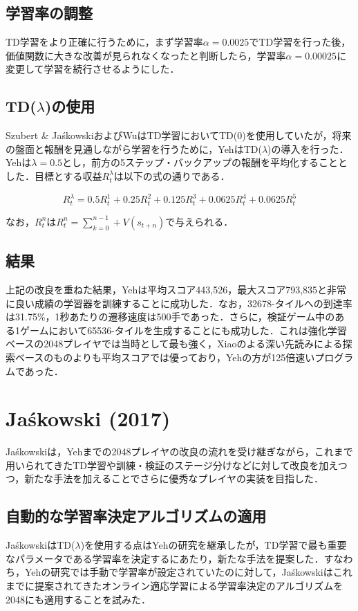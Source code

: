 \documentclass{suribt}
\begin{document}
\subsection{学習率の調整}
TD学習をより正確に行うために，まず学習率$\alpha = 0.0025$でTD学習を行った後，価値関数に大きな改善が見られなくなったと判断したら，学習率$\alpha = 0.00025$に変更して学習を続行させるようにした．

\subsection{TD(${\lambda}$)の使用}
Szubert \& Ja\'{s}kowskiおよびWuはTD学習においてTD(0)を使用していたが，将来の盤面と報酬を見通しながら学習を行うために，YehはTD(${\lambda}$)の導入を行った．Yehは${\lambda}=0.5$とし，前方の5ステップ・バックアップの報酬を平均化することとした．目標とする収益$R^{\lambda}_t$は以下の式の通りである．

\[
R^{\lambda}_t = 0.5R^1_t + 0.25R^2_t + 0.125R^3_t + 0.0625R^4_t + 0.0625R^5_t
\]

なお，$R^n_t$は$R^n_t = \sum_{k=0}^{n-1} + V(s_{t+n})$で与えられる．

\subsection{結果}
上記の改良を重ねた結果，Yehは平均スコア443,526，最大スコア793,835と非常に良い成績の学習器を訓練することに成功した．なお，32678-タイルへの到達率は31.75\%，1秒あたりの遷移速度は500手であった．さらに，検証ゲーム中のある1ゲームにおいて65536-タイルを生成することにも成功した．これは強化学習ベースの2048プレイヤでは当時として最も強く，Xiaoのよる深い先読みによる探索ベースのものよりも平均スコアでは優っており，Yehの方が125倍速いプログラムであった．

\section{Ja\'{s}kowski (2017)}
Ja\'{s}kowskiは，Yehまでの2048プレイヤの改良の流れを受け継ぎながら，これまで用いられてきたTD学習や訓練・検証のステージ分けなどに対して改良を加えつつ，新たな手法を加えることでさらに優秀なプレイヤの実装を目指した．

\subsection{自動的な学習率決定アルゴリズムの適用}
Ja\'{s}kowskiはTD(${\lambda}$)を使用する点はYehの研究を継承したが，TD学習で最も重要なパラメータである学習率を決定するにあたり，新たな手法を提案した．すなわち，Yehの研究では手動で学習率が設定されていたのに対して，Ja\'{s}kowskiはこれまでに提案されてきたオンライン適応学習による学習率決定のアルゴリズムを2048にも適用することを試みた．
\end{document}

